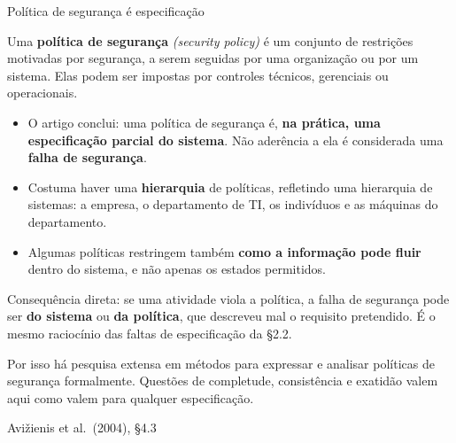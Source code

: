 \documentclass{beamer}
\newcommand{\en}[1]{{\color{depCinza}\textit{#1}}}
\newcommand{\sect}[1]{\par\smallskip\hfill{\tiny\color{black!55}Avi\v{z}ienis et al.\ (2004), #1}}
\begin{document}
\begin{frame}{Pol\'itica de seguran\c{c}a \'e especifica\c{c}\~ao}
    \footnotesize
    \begin{defi}
        \scriptsize
        Uma \textbf{pol\'itica de seguran\c{c}a} \en{(security policy)} \'e um conjunto de restri\c{c}\~oes motivadas por seguran\c{c}a, a serem seguidas por uma organiza\c{c}\~ao ou por um sistema. Elas podem ser impostas por controles t\'ecnicos, gerenciais ou operacionais.
    \end{defi}
    \medskip
    \begin{itemize}
        \item O artigo conclui: uma pol\'itica de seguran\c{c}a \'e, \textbf{na pr\'atica, uma especifica\c{c}\~ao parcial do sistema}. N\~ao ader\^encia a ela \'e considerada uma \textbf{falha de seguran\c{c}a}.
        \item Costuma haver uma \textbf{hierarquia} de pol\'iticas, refletindo uma hierarquia de sistemas: a empresa, o departamento de TI, os indiv\'iduos e as m\'aquinas do departamento.
        \item Algumas pol\'iticas restringem tamb\'em \textbf{como a informa\c{c}\~ao pode fluir} dentro do sistema, e n\~ao apenas os estados permitidos.
    \end{itemize}
    \medskip
    \begin{ancora}
        \footnotesize
        Consequ\^encia direta: se uma atividade viola a pol\'itica, a falha de seguran\c{c}a pode ser \textbf{do sistema} ou \textbf{da pol\'itica}, que descreveu mal o requisito pretendido. \'E o mesmo racioc\'inio das faltas de especifica\c{c}\~ao da \S2.2.
    \end{ancora}
    \medskip
    {\scriptsize Por isso h\'a pesquisa extensa em m\'etodos para expressar e analisar pol\'iticas de seguran\c{c}a formalmente. Quest\~oes de completude, consist\^encia e exatid\~ao valem aqui como valem para qualquer especifica\c{c}\~ao.}
    \sect{\S4.3}
\end{frame}
\end{document}
